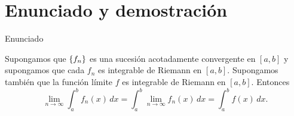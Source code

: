 \section{Enunciado y demostración}

\begin{frame}{Enunciado}
    \begin{teorema}
        Supongamos que $\left\{ f_n \right\}$ es una sucesión acotadamente convergente en $[a,b]$ y supongamos que cada $f_n$ es integrable de Riemann en $[a,b]$. Supongamos también que la función límite $f$ es integrable de Riemann en $[a,b]$. Entonces
        \[
            \lim_{n\to\infty}\int_a^b f_n(x)\,dx=\int_a^b\lim_{n\to\infty}f_n(x)\,dx=\int_a^b f(x)\,dx.
        \]
    \end{teorema}
\end{frame}
